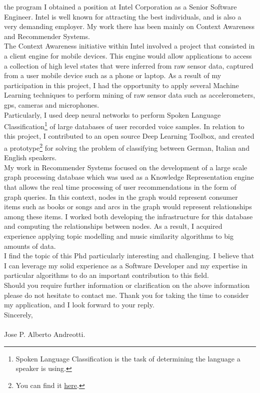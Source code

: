 \documentclass[letter,12pt,english]{article}
\begin{document}
the program I obtained a position at Intel Corporation as a Senior Software Engineer. 
Intel is well known for attracting the best individuals, and is also a very demanding employer.
My work there has been mainly on Context Awareness and 
Recommender Systems.\\
The Context Awareness initiative within Intel involved a project that consisted
in a client engine for mobile devices. This engine would allow applications to access a collection 
of high level states that were inferred from raw sensor data, captured from a user mobile device such
as a phone or laptop.
As a result of my participation in this project, I had the opportunity to apply several Machine Learning
techniques to perform mining of raw sensor data such as accelerometers, gps, cameras and microphones.\\
Particularly, I used deep neural networks to perform Spoken Language Classification\footnote{Spoken Language Classification
is the task of determining the language a speaker is using.} of large databases of user recorded voice samples. In relation to this project, I contributed to an 
open source Deep Learning Toolbox, and created a prototype\footnote{You can find it
\href{https://github.com/albertoandreottiATgmail/DeepLearnToolbox/tree/langIdent}{here}.}
for solving the problem of classifying between German, Italian and English speakers.  
\\
My work in Recommender Systems focused on the development of a large scale graph processing database which 
was used as a Knowledge Representation engine that allows the real time processing of user recommendations in 
the form of graph queries. In this context, nodes in the graph would represent consumer items such as books or 
songs and arcs in the graph would represent relationships among these items. I worked both developing the 
infrastructure for this database and computing the relationships between nodes. As a result, I acquired experience
applying topic modelling and music similarity algorithms to big amounts of data.
\\
I find the topic of this Phd particularly interesting and challenging. I believe that I can leverage
my solid experience as a Software Developer and my expertise in particular algorithms to do an important
contribution to this field.\\
Should you require further information or clarification on the above information please do not hesitate to contact me.
Thank you for taking the time to consider my application, and I look forward to your reply.
\\

Sincerely,
\\
\\
Jose P. Alberto Andreotti.
\end{document}
